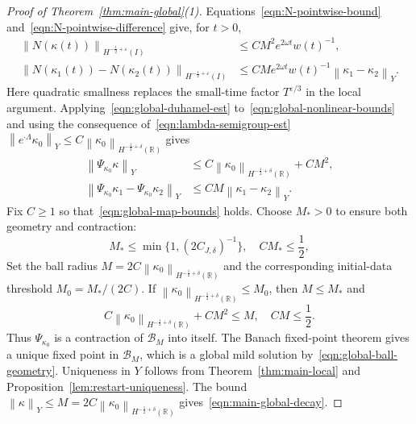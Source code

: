 \documentclass[11pt,reqno]{amsart}
\theoremstyle{plain}
\theoremstyle{definition}
\numberwithin{equation}{section}
\newcommand{\mc}[1]{\mathcal{#1}}
\newcommand{\norm}[1]{\left\lVert #1 \right\rVert}
\newcommand{\R}{\mathbb{R}}
\newcommand{\hi}[1]{H^{#1}(I)}
\newcommand{\hr}[1]{H^{#1}(\R)}
\begin{document}
\begin{proof}[Proof of Theorem~\ref{thm:main-global}(1)]
Equations~\eqref{eqn:N-pointwise-bound} and~\eqref{eqn:N-pointwise-difference} give, for $t>0$,
\begin{equation}\label{eqn:global-nonlinear-bounds}
    \begin{aligned}
        \norm{N(\kappa(t))}_{\hi{-\frac12+\varepsilon}}
        &\le CM^2e^{2\omega t}w(t)^{-1},\\
        \norm{N(\kappa_1(t))-N(\kappa_2(t))}_{\hi{-\frac12+\varepsilon}}
        &\le CMe^{2\omega t}w(t)^{-1}\norm{\kappa_1-\kappa_2}_Y.
    \end{aligned}
\end{equation}
Here quadratic smallness replaces the small-time factor
$T^{\varepsilon/3}$ in the local argument.
Applying~\eqref{eqn:global-duhamel-est} to~\eqref{eqn:global-nonlinear-bounds} and using the consequence of~\eqref{eqn:lambda-semigroup-est}
$\norm{e^{\cdot\Lambda}\kappa_0}_Y
\le C\norm{\kappa_0}_{\hr{-\frac12+\delta}}$ gives
\begin{equation}\label{eqn:global-map-bounds}
    \begin{aligned}
        \norm{\Psi_{\kappa_0}\kappa}_Y
        &\le C\norm{\kappa_0}_{\hr{-\frac12+\delta}}+CM^2,\\
        \norm{\Psi_{\kappa_0}\kappa_1-\Psi_{\kappa_0}\kappa_2}_Y
        &\le CM\norm{\kappa_1-\kappa_2}_Y.
    \end{aligned}
\end{equation}
Fix $C\ge1$ so that~\eqref{eqn:global-map-bounds} holds. Choose $M_*>0$
to ensure both geometry and contraction:
\begin{equation}
    M_*\le\min\{1,(2C_{J,\delta})^{-1}\},\quad CM_*\le\frac12,
\end{equation}
Set the ball radius $M=2C\norm{\kappa_0}_{\hr{-\frac12+\delta}}$ and
the corresponding initial-data threshold $M_0=M_*/(2C)$. If $\norm{\kappa_0}_{\hr{-\frac12+\delta}}\le M_0$, then
$M\le M_*$ and
\begin{equation}
    C\norm{\kappa_0}_{\hr{-\frac12+\delta}}+CM^2\le M,
    \quad CM\le\frac12.
\end{equation}
Thus $\Psi_{\kappa_0}$ is a contraction of $\mc B_M$ into itself.
The Banach fixed-point theorem gives a unique fixed point in $\mc B_M$,
which is a global mild solution by~\eqref{eqn:global-ball-geometry}.
Uniqueness in $Y$ follows from Theorem~\ref{thm:main-local} and
Proposition~\ref{lem:restart-uniqueness}. The bound
$\norm{\kappa}_Y\le M=2C\norm{\kappa_0}_{\hr{-\frac12+\delta}}$
gives~\eqref{eqn:main-global-decay}.
\end{proof}
\end{document}
